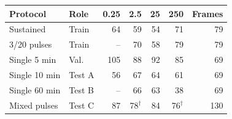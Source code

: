 \begin{tabular}{llrrrrr}
\toprule
Protocol & Role & 0.25 & 2.5 & 25 & 250 & Frames \\
\midrule
Sustained & Train & 64 & 59 & 54 & 71 & 79 \\
3/20 pulses & Train & -- & 70 & 58 & 79 & 79 \\
Single 5 min & Val. & 105 & 88 & 92 & 85 & 69 \\
Single 10 min & Test A & 56 & 67 & 64 & 61 & 69 \\
Single 60 min & Test B & -- & 66 & 63 & 38 & 69 \\
Mixed pulses & Test C & 87 & 78$^\dagger$ & 84 & 76$^\dagger$ & 130 \\
\bottomrule
\end{tabular}
